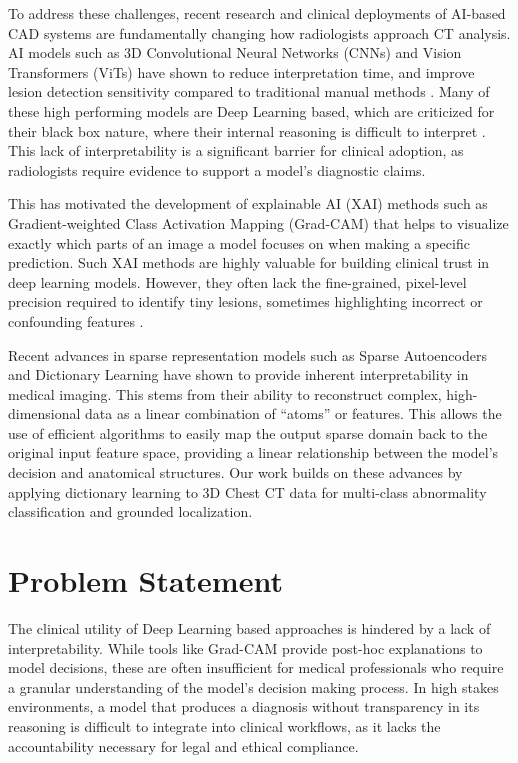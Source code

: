 To address these challenges, recent research and clinical deployments of AI-based
CAD systems are fundamentally changing how radiologists approach CT analysis. AI models such as 3D
Convolutional Neural Networks (CNNs) and Vision Transformers (ViTs) have shown to reduce interpretation time, and improve
lesion detection sensitivity compared to traditional manual methods \cite{LITJENS201760}.
Many of these high performing models are Deep Learning based, which are criticized for their black box nature,
where their internal reasoning is difficult to interpret \cite{tjoa2021survey}. This lack of interpretability is a significant barrier for
clinical adoption, as radiologists require evidence to support a model's diagnostic claims.

This has motivated the development of explainable AI (XAI) methods such as Gradient-weighted Class Activation Mapping (Grad-CAM)
that helps to visualize exactly which parts of an image a model focuses on when making a specific prediction.
Such XAI methods are highly valuable for building clinical trust in deep learning models. However, they
often lack the fine-grained, pixel-level precision required to identify tiny lesions,
sometimes highlighting incorrect or confounding features \cite{ennab2025advancing}.

Recent advances in sparse representation models \cite{liyanage2022covid, wesp2026sparse} such as Sparse Autoencoders
and Dictionary Learning have shown to provide
inherent interpretability in medical imaging. This stems from their ability to reconstruct complex, high-dimensional
data as a linear combination of ``atoms'' or features. This allows the use of efficient algorithms to easily map the
output sparse domain back to the original input feature space, providing a linear relationship between the model's
decision and anatomical structures.
Our work builds on these advances by applying dictionary learning to 3D Chest CT data for multi-class abnormality classification
and grounded localization.

\section{Problem Statement}
The clinical utility of Deep Learning based approaches is hindered by a lack of interpretability. While tools like Grad-CAM
provide post-hoc explanations to model decisions, these are often insufficient for medical professionals who require a granular
understanding of the model's decision making process. In high stakes environments, a model that produces a diagnosis without
transparency in its reasoning is difficult to integrate into clinical workflows, as it lacks the accountability necessary for
legal and ethical compliance. \cite{tjoa2021survey}

